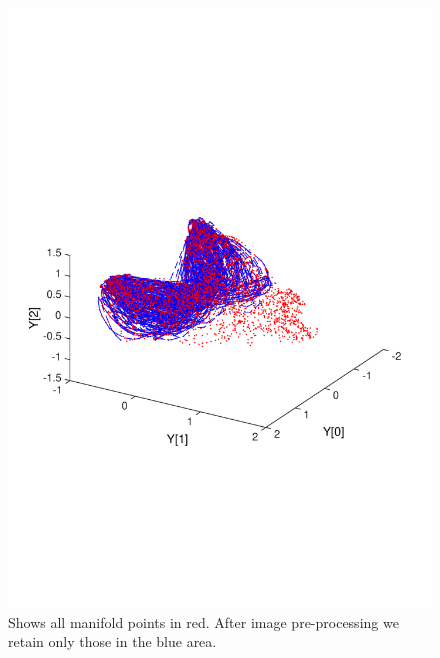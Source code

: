 \documentclass[11pt]{article} %
\begin{document}
\begin{figure}
\centering
\includegraphics*[trim={0 5cm 0 9cm},clip,width=0.75\linewidth,clip]{manifoldAfterImageProcessing.pdf} 
\caption{Shows all manifold points in red. After image pre-processing we retain only those in the blue area. }
\label{fig:manifoldAfterImageProcessing}
\end{figure}
\end{document}
